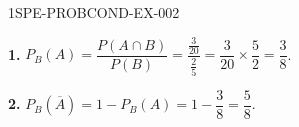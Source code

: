 \begin{corrige}{1SPE-PROBCOND-EX-002}

\textbf{1.} $P_B(A) = \dfrac{P(A \cap B)}{P(B)} = \dfrac{\frac{3}{20}}{\frac{2}{5}} = \dfrac{3}{20} \times \dfrac{5}{2} = \dfrac{3}{8}$.

\medskip
\textbf{2.} $P_B(\overline{A}) = 1 - P_B(A) = 1 - \dfrac{3}{8} = \dfrac{5}{8}$.

\end{corrige}
